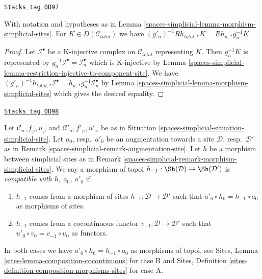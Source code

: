 \begin{lemma}
\label{spaces-simplicial-lemma-direct-image-morphism-simplicial-sites}
\href{https://stacks.math.columbia.edu/tag/0D97}{\texttt{Stacks tag 0D97}}

With notation and hypotheses as in Lemma \ref{spaces-simplicial-lemma-morphism-simplicial-sites}.
For $K \in D(\mathcal{C}_{total})$ we have
$(g'_n)^{-1}Rh_{total, *}K = Rh_{n, *}g_n^{-1}K$.
\end{lemma}

\begin{proof}
Let $\mathcal{I}^\bullet$ be a K-injective complex on $\mathcal{C}_{total}$
representing $K$. Then $g_n^{-1}K$ is represented by
$g_n^{-1}\mathcal{I}^\bullet = \mathcal{I}_n^\bullet$
which is K-injective by
Lemma \ref{spaces-simplicial-lemma-restriction-injective-to-component-site}.
We have $(g'_n)^{-1}h_{total, *}\mathcal{I}^\bullet =
h_{n, *}g_n^{-1}\mathcal{I}_n^\bullet$ by
Lemma \ref{spaces-simplicial-lemma-morphism-simplicial-sites}
which gives the desired equality.
\end{proof}

\begin{remark}
\label{spaces-simplicial-remark-morphism-augmentation-simplicial-sites}
\href{https://stacks.math.columbia.edu/tag/0D98}{\texttt{Stacks tag 0D98}}

Let $\mathcal{C}_n, f_\varphi, u_\varphi$ and
$\mathcal{C}'_n, f'_\varphi, u'_\varphi$ be as in
Situation \ref{spaces-simplicial-situation-simplicial-site}.
Let $a_0$, resp.\ $a'_0$ be an augmentation
towards a site $\mathcal{D}$, resp.\ $\mathcal{D}'$
as in Remark \ref{spaces-simplicial-remark-augmentation-site}.
Let $h$ be a morphism between simplicial sites as in
Remark \ref{spaces-simplicial-remark-morphism-simplicial-sites}.
We say a morphism of topoi $h_{-1} : \Sh(\mathcal{D}) \to \Sh(\mathcal{D}')$
is {\it compatible with $h$, $a_0$, $a'_0$} if
\begin{enumerate}
\item[(A)] $h_{-1}$ comes from a morphism of sites
$h_{-1} : \mathcal{D} \to \mathcal{D}'$
such that $a'_0 \circ h_0 = h_{-1} \circ a_0$
as morphisms of sites.
\item[(B)] $h_{-1}$ comes from a cocontinuous functor
$v_{-1} : \mathcal{D} \to \mathcal{D}'$
such that $u'_0 \circ v_0 = v_{-1} \circ u_0$
as functors.
\end{enumerate}
In both cases we have $a'_0 \circ h_0 = h_{-1} \circ a_0$
as morphisms of topoi, see
Sites, Lemma \ref{sites-lemma-composition-cocontinuous}
for case B and Sites,
Definition \ref{sites-definition-composition-morphisms-sites}
for case A.
\end{remark}

